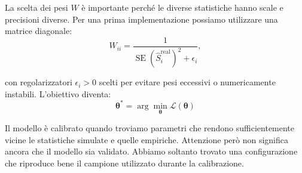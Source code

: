 La scelta dei pesi \(W\) è importante perché le diverse statistiche hanno scale e precisioni diverse.
Per una prima implementazione possiamo utilizzare una matrice diagonale:
\[
W_{ii}=
\frac{1}{
\operatorname{SE}(\widehat S_i^{\mathrm{real}})^2+\epsilon_i
},
\]

con regolarizzatori \(\epsilon_i>0\) scelti per evitare pesi eccessivi o numericamente instabili.
L'obiettivo diventa:
\[
\boxed{
\boldsymbol\theta^*
=
\arg\min_{\boldsymbol\theta}
\mathcal L(\boldsymbol\theta)
}
\]

Il modello è calibrato quando troviamo parametri che rendono sufficientemente vicine le statistiche simulate e quelle empiriche.
Attenzione però non significa ancora che il modello sia validato. Abbiamo soltanto trovato una configurazione che riproduce bene il campione 
utilizzato durante la calibrazione.

